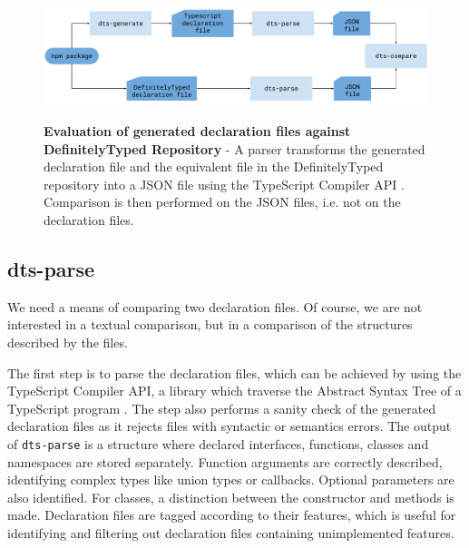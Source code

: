 \documentclass[english,cleveref,autoref,submission]{programming}
\begin{document}
 
\begin{figure}[tp]
    \begin{centering}
        {\includegraphics[width=1\textwidth]{evaluation-diagram.pdf}}
        \caption[Evaluation against DefinitelyTyped Repository]{\textbf{Evaluation of generated declaration files against DefinitelyTyped Repository} - A parser transforms the generated declaration file and the equivalent file in the DefinitelyTyped repository into a JSON file using the TypeScript Compiler API \cite{typescript-compiler-api}. Comparison is then performed on the JSON files, i.e. not on the declaration files.}
        \label{fig:evaluation-diagram}
    \end{centering}
\end{figure}

\subsection{dts-parse}
We need a means of comparing two declaration files. Of
course, we are not interested in a textual comparison, but in a
comparison of the structures described by the files.

The first step is to parse the declaration files, which can be
achieved by using the TypeScript Compiler API, a library which traverse the
Abstract Syntax Tree of a TypeScript program
\cite{typescript-compiler-api}. 
The step also performs a sanity check of the generated declaration
files as it rejects files with syntactic or semantics errors.
The output of \texttt{dts-parse} is a structure where declared
{interfaces}, {functions}, {classes} and
{namespaces} are stored separately. Function arguments are
correctly described, identifying complex types like union types or
callbacks. Optional parameters are also identified. For
{classes}, a distinction between the constructor and methods
is made. Declaration files are tagged according to their features, which is useful for identifying and filtering out declaration files containing unimplemented features.
\end{document}
